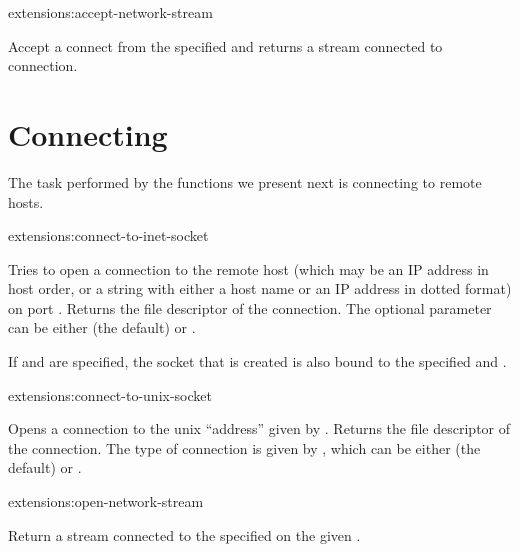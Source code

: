 \begin{defun}{extensions:}{accept-network-stream}{%
    }

  Accept a connect from the specified  and returns a stream 
  connected to connection.  
\end{defun}

\section{Connecting}

The task performed by the functions we present next is connecting to
remote hosts.

\begin{defun}{extensions:}{connect-to-inet-socket}{%
    }
  
  Tries to open a connection to the remote host  (which may
  be an IP address in host order, or a string with either a host name
  or an IP address in dotted format) on port . Returns the
  file descriptor of the connection.  The optional parameter
   can be either  (the default) or .

  If  and  are specified, the socket
  that is created is also bound to the specified  and
  .

\end{defun}

\begin{defun}{extensions:}{connect-to-unix-socket}{%
    }
  
  Opens a connection to the unix ``address'' given by .
  Returns the file descriptor of the connection.  The type of
  connection is given by , which can be either 
  (the default) or .

\end{defun}

\begin{defun}{extensions:}{open-network-stream}{%
    }
  
   Return a stream connected to the specified  on the given .
\end{defun}


